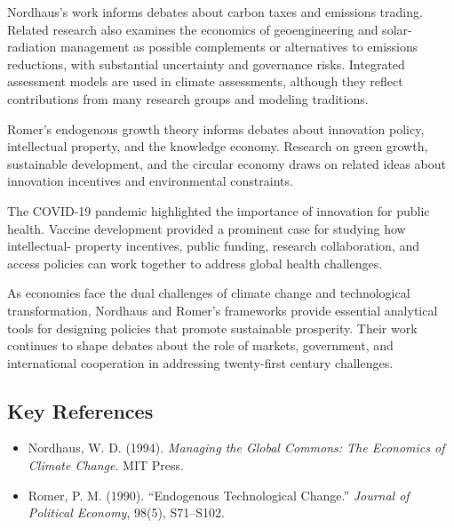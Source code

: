 Nordhaus's work informs debates about carbon taxes and emissions trading. Related
research also examines the economics of geoengineering and solar-radiation
management as possible complements or alternatives to emissions reductions, with
substantial uncertainty and governance risks. Integrated assessment models are
used in climate assessments, although they reflect contributions from many
research groups and modeling traditions.

Romer's endogenous growth theory informs debates about innovation policy,
intellectual property, and the knowledge economy. Research on green growth,
sustainable development, and the circular economy draws on related ideas about
innovation incentives and environmental constraints.

The COVID-19 pandemic highlighted the importance of innovation for public health.
Vaccine development provided a prominent case for studying how intellectual-
property incentives, public funding, research collaboration, and access policies
can work together to address global health challenges.

As economies face the dual challenges of climate change and technological
transformation, Nordhaus and Romer's frameworks provide essential analytical
tools for designing policies that promote sustainable prosperity. Their work
continues to shape debates about the role of markets, government, and
international cooperation in addressing twenty-first century challenges.

\subsection*{Key References}
\begin{itemize}
    \item Nordhaus, W. D. (1994). \textit{Managing the Global Commons: The Economics of Climate Change}. MIT Press.
    \item Romer, P. M. (1990). ``Endogenous Technological Change.'' \textit{Journal of Political Economy}, 98(5), S71--S102.
\end{itemize}
